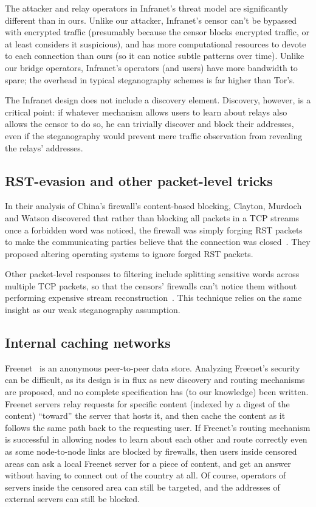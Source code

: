 \documentclass{llncs}
\begin{document}
The attacker and relay operators in Infranet's threat model are significantly
different than in ours.  Unlike our attacker, Infranet's censor can't be
bypassed with encrypted traffic (presumably because the censor blocks
encrypted traffic, or at least considers it suspicious), and has more
computational resources to devote to each connection than ours (so it can
notice subtle patterns over time).  Unlike our bridge operators, Infranet's
operators (and users) have more bandwidth to spare; the overhead in typical
steganography schemes is far higher than Tor's.

The Infranet design does not include a discovery element.  Discovery,
however, is a critical point: if whatever mechanism allows users to learn
about relays also allows the censor to do so, he can trivially discover and
block their addresses, even if the steganography would prevent mere traffic
observation from revealing the relays' addresses.

\subsection{RST-evasion and other packet-level tricks}

In their analysis of China's firewall's content-based blocking, Clayton,
Murdoch and Watson discovered that rather than blocking all packets in a TCP
streams once a forbidden word was noticed, the firewall was simply forging
RST packets to make the communicating parties believe that the connection was
closed~\cite{clayton:pet2006}. They proposed altering operating systems
to ignore forged RST packets.

Other packet-level responses to filtering include splitting
sensitive words across multiple TCP packets, so that the censors'
firewalls can't notice them without performing expensive stream
reconstruction~\cite{ptacek98insertion}. This technique relies on the
same insight as our weak steganography assumption.

\subsection{Internal caching networks}

Freenet~\cite{freenet-pets00} is an anonymous peer-to-peer data store.
Analyzing Freenet's security can be difficult, as its design is in flux as
new discovery and routing mechanisms are proposed, and no complete
specification has (to our knowledge) been written.  Freenet servers relay
requests for specific content (indexed by a digest of the content)
``toward'' the server that hosts it, and then cache the content as it
follows the same path back to
the requesting user.  If Freenet's routing mechanism is successful in
allowing nodes to learn about each other and route correctly even as some
node-to-node links are blocked by firewalls, then users inside censored areas
can ask a local Freenet server for a piece of content, and get an answer
without having to connect out of the country at all.  Of course, operators of
servers inside the censored area can still be targeted, and the addresses of
external servers can still be blocked.
\end{document}

